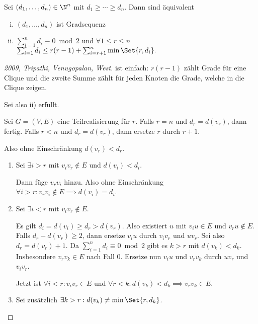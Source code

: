 \begin{st}
    Sei $(d_1, \dotsc, d_n) \in \N^n$ mit $d_1 \ge \dotsb \ge d_n$.
    Dann sind äquivalent
    \begin{enumerate}[i)]
        \item
            $(d_1, \dotsc, d_n)$ ist Gradsequenz
        \item
            $\sum_{i=1}^n d_i \equiv 0 \bmod 2$ und $\forall 1 \le r \le n$
            \begin{math}
                 \sum_{i=1}^r d_i \le r(r-1) + \sum_{i=r+1}^n \min\Set{r, d_i}.
            \end{math}
    \end{enumerate}
    \begin{proof}[2009, Tripathi, Venugopalan, West]
        \ProofImplication ist einfach: $r(r-1)$ zählt Grade für eine Clique und die zweite Summe zählt für jeden Knoten die Grade, welche in die Clique zeigen.

        Sei also ii) erfüllt.

        Sei $G = (V, E)$ eine Teilrealisierung für $r$.
        Falls $r = n$ und $d_r = d(v_r)$, dann fertig.
        Falls $r < n$ und $d_r = d(v_r)$, dann ersetze $r$ durch $r + 1$.

        Also ohne Einschränkung $d(v_r) < d_r$.
        \begin{enumerate}[1), start=0]
            \item
                Sei $\exists i > r$ mit $v_i v_r \not\in E$ und $d(v_i) < d_i$.

                Dann füge $v_r v_i$ hinzu.
                Also ohne Einschränkung $\forall i > r: v_r v_i \not\in E \implies d(v_i) = d_i$.
            \item
                Sei $\exists i < r$ mit $v_i v_r \not\in E$.

                Es gilt $d_i = d(v_i) \ge d_r > d(v_r)$.
                Also existiert $u$ mit $v_i u \in E$ und $v_r u \not\in E$.
                Falls $d_r - d(v_r) \ge 2$, dann ersetze $v_i u$ durch $v_i v_r$ und $uv_r$.
                Sei also $d_r = d(v_r) + 1$.
                Da $\sum_{i=1}^n d_i \equiv 0 \bmod 2$ gibt es $k > r$ mit $d(v_k) < d_k$.
                Insbesondere $v_r v_k \in E$ nach Fall 0.
                Ersetze nun $v_i u$ und $v_r v_k$ durch $u v_r$ und $v_i v_r$.

                Jetzt ist $\forall i < r: v_i v_r \in E$ und $\forall r < k: d(v_k) < d_k \implies v_r v_k \in E$.
            \item
                Sei zusätzlich $\exists k > r: d(v_k) \neq \min\Set{r, d_k}$.


\end{enumerate}
\end{proof}
\end{st}
